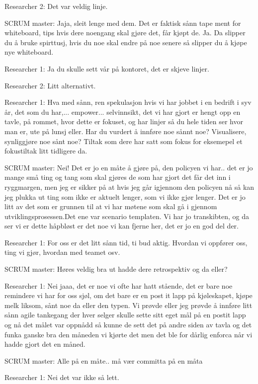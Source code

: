 \documentclass[12pt, a4paper]{report}
\begin{document}
Researcher 2: Det var veldig linje.

SCRUM master: Jaja, sleit lenge med dem. Det er faktisk sånn tape ment for whiteboard, tips hvis dere noengang skal gjøre det, får kjøpt de. Ja. Da slipper du å bruke spirttusj, hvis du noe skal endre på noe senere så slipper du å kjøpe nye whiteboard. 

Researcher 1: Ja du skulle sett vår på kontoret, det er skjeve linjer.

Researcher 2: Litt alternativt.

Researcher 1: Hva med sånn, ren spekulasjon hvis vi har jobbet i en bedrift i syv år, det som du har,... empower... selvinnsikt, det vi har gjort er hengt opp en tavle, på rommet, hvor dette er fokuset, og har linjer så du hele tiden ser hvor man er, ute på lunsj eller. Har du vurdert å innføre noe sånnt noe? Visualisere, synliggjøre noe sånt noe? Tiltak som dere har satt som fokus for eksemepel et fokustiltak litt tidligere da.

SCRUM master: Nei! Det er jo en måte å gjøre på, den policyen vi har.. det er jo mange små ting og tang som skal gjøres de som har gjort det får det inn i ryggmargen, men jeg er sikker på at hvis jeg går igjennom den policyen nå så kan jeg plukka ut ting som ikke er aktuelt lenger, som vi ikke gjør lenger. Det er jo litt av det som er grunnen til at vi har møtene som skal gå i gjennom utviklingsprosessen.Det ene var scenario templaten. Vi har jo transkibten, og da ser vi er dette håpbløst er det noe vi kan fjerne her, det er jo en god del der. 

Researcher 1: For oss er det litt sånn tid, ti bud aktig. Hvordan vi oppfører oss, ting vi gjør, hvordan med teamet osv.

SCRUM master: Høres veldig bra ut hadde dere retrospektiv og da eller?

Researcher 1: Nei jaaa, det er noe vi ofte har hatt stående, det er bare noe remindere vi har for oss sjøl, om det bare er en post it lapp på kjøleskapet, kjøpe melk liksom, sånt noe da eller den typen. Vi prøvde eller jeg prøvde å innføre litt sånn agile tankegang der hver selger skulle sette sitt eget mål på en postit lapp og nå det målet var oppnådd så kunne de sett det på andre siden av tavla og det funka ganske bra den måneden vi kjørte det men det ble for dårlig enforca når vi hadde gjort det en måned.

SCRUM master: Alle på en måte.. må vær committa på en måta

Researcher 1: Nei det var ikke så lett.
\end{document}

